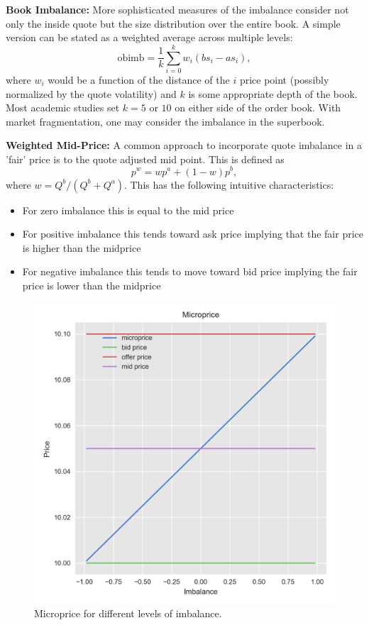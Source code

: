 \noindent\textbf{Book Imbalance:} More sophisticated measures of the imbalance consider not only the inside quote but the size distribution over the entire book. A simple version can be stated as a weighted average across multiple levels:
	\begin{equation} \label{eq:microprc}
	\text{obimb} = \frac{1}{k}\sum_{i=0}^k w_i (bs_i-  as_i),
	\end{equation}
where $w_i$ would be a function of the distance of the $i$ price point (possibly normalized by the quote volatility) and $k$ is some appropriate depth of the book. Most academic studies set $k=5$ or $10$ on either side of the order book. With market fragmentation, one may consider the imbalance in the superbook. \twomedskip


\noindent\textbf{Weighted Mid-Price:} A common approach to incorporate quote imbalance in a 'fair' price is to the quote adjusted mid point. This is defined as
	\begin{equation} \label{eqn:microprice}
	p^w= w p^a + (1-w) p^b,
	\end{equation}
where $w= Q^b/(Q^b+Q^a)$. This has the following intuitive characteristics: 
	\begin{itemize}
	\item For zero imbalance this is equal to the mid price
	\item For positive imbalance this tends toward ask price implying that the fair price is higher than the midprice
	\item For negative imbalance this tends to move toward bid price implying the fair price is lower than the midprice
	\end{itemize}

	\begin{figure}[!ht]
	\centering
	\includegraphics[width=\textwidth]{chapters/chapter_trade_data_models/figures/microprice.png} 
	\caption{Microprice for different levels of imbalance.\label{fig:microprice}}
	\end{figure}


